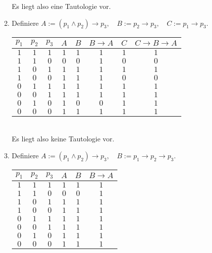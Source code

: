 \begin{solution}
\begin{enumerate}[label = \alph*.]
  Es liegt also eine Tautologie vor.

  \item Definiere $A := (p_1 \land p_2) \to p_3, \quad B := p_2 \to p_3, \quad C:= p_1 \to p_3$. \\

  \begin{tabular}{|c|c|c|c|c|c|c|c|}
    \hline
    $p_1$ & $p_2$ & $p_3$ & $A$ & $B$ & $B \to A$
    & $C$ & $C \to B \to A$\\
    \hline
    $1$ & $1$ & $1$ & $1$ & $1$ & $1$ & $1$ & $1$\\
    \hline
    $1$ & $1$ & $0$ & $0$ & $0$ & $1$ & $0$ & $0$\\
    \hline
    $1$ & $0$ & $1$ & $1$ & $1$ & $1$ & $1$ & $1$\\
    \hline
    $1$ & $0$ & $0$ & $1$ & $1$ & $1$ & $0$ & $0$\\
    \hline
    $0$ & $1$ & $1$ & $1$ & $1$ & $1$ & $1$ & $1$\\
    \hline
    $0$ & $0$ & $1$ & $1$ & $1$ & $1$ & $1$ & $1$\\
    \hline
    $0$ & $1$ & $0$ & $1$ & $0$ & $0$ & $1$ & $1$\\
    \hline
    $0$ & $0$ & $0$ & $1$ & $1$ & $1$ & $1$ & $1$\\
    \hline
  \end{tabular} \\

  Es liegt also keine Tautologie vor.

  \item Definiere $A:= (p_1 \land p_2) \to p_3, \quad B := p_1 \to p_2 \to p_3$. \\

  \begin{tabular}{|c|c|c|c|c|c|}
    \hline
    $p_1$ & $p_2$ & $p_3$ & $A$ & $B$ & $B \to A$\\
    \hline
    $1$ & $1$ & $1$ & $1$ & $1$ & $1$\\
    \hline
    $1$ & $1$ & $0$ & $0$ & $0$ & $1$\\
    \hline
    $1$ & $0$ & $1$ & $1$ & $1$ & $1$\\
    \hline
    $1$ & $0$ & $0$ & $1$ & $1$ & $1$\\
    \hline
    $0$ & $1$ & $1$ & $1$ & $1$ & $1$\\
    \hline
    $0$ & $0$ & $1$ & $1$ & $1$ & $1$\\
    \hline
    $0$ & $1$ & $0$ & $1$ & $1$ & $1$\\
    \hline
    $0$ & $0$ & $0$ & $1$ & $1$ & $1$\\
    \hline
  \end{tabular} \\


\end{enumerate}
\end{solution}
